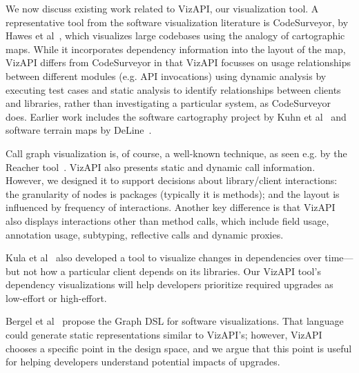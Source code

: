 We now discuss existing work related to VizAPI, our visualization tool.
A representative tool from the software visualization literature is
CodeSurveyor, by Hawes et al~\cite{hawes15:_codes}, which visualizes large
codebases using the analogy of cartographic maps. While it
incorporates dependency information into the layout of the map, VizAPI
differs from CodeSurveyor in that VizAPI focusses on usage relationships
between different modules (e.g. API invocations) using dynamic analysis by executing test
cases and static analysis to identify relationships between clients and libraries, rather
than investigating a particular system, as CodeSurveyor does.  Earlier
work includes the software cartography project by Kuhn et
al~\cite{kuhn10:_softw} and software terrain maps by DeLine~\cite{deline05:_stayin}.


Call graph visualization is, of course, a well-known technique, as seen e.g. by the Reacher tool~\cite{latoza11:_visual_call_graph}. 
VizAPI also presents static and dynamic call information. However, we designed
it to support decisions about library/client interactions: the granularity of nodes is packages (typically it is methods);
and the layout is influenced by frequency of interactions. Another key difference is that VizAPI also displays interactions other than method calls, which include field usage, annotation usage, subtyping, reflective calls and dynamic proxies.

Kula et al~\cite{kula14:_visual_evolut_system_their_librar_depen} also developed a tool
to visualize changes in dependencies over time---but not how a particular client depends on its libraries. 
Our VizAPI tool's dependency visualizations will help developers
prioritize required upgrades as low-effort or high-effort.
 

Bergel et al~\cite{bergel14:_domain_specif_languag_visual_softw_depen_graph} propose the {\sc Graph} DSL
for software visualizations. That language could generate static representations similar to VizAPI's; however,
VizAPI chooses a specific point in the design space, and we argue that this point is useful for helping developers understand
potential impacts of upgrades.

